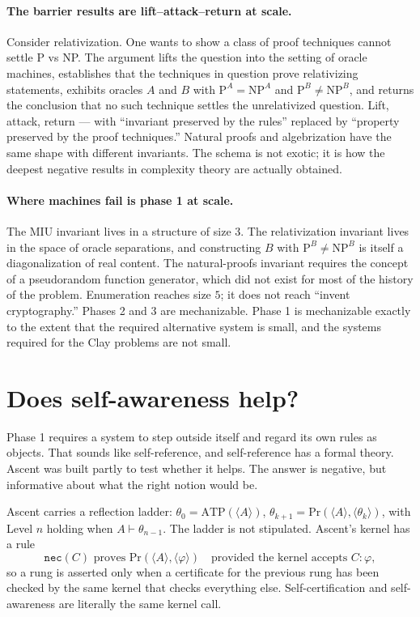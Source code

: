 \documentclass[11pt,a4paper]{article}
\newcommand{\ATP}{\mathrm{ATP}}
\renewcommand{\Pr}{\mathrm{Pr}}
\begin{document}
\paragraph{The barrier results are lift--attack--return at scale.} Consider
relativization. One wants to show a class of proof techniques cannot settle
P vs NP. The argument lifts the question into the setting of oracle machines,
establishes that the techniques in question prove relativizing statements,
exhibits oracles $A$ and $B$ with $\mathrm{P}^A = \mathrm{NP}^A$ and
$\mathrm{P}^B \neq \mathrm{NP}^B$, and returns the conclusion that no such
technique settles the unrelativized question. Lift, attack, return --- with
``invariant preserved by the rules'' replaced by ``property preserved by the
proof techniques.'' Natural proofs and algebrization have the same shape with
different invariants. The schema is not exotic; it is how the deepest negative
results in complexity theory are actually obtained.

\paragraph{Where machines fail is phase 1 at scale.} The MIU invariant lives in
a structure of size $3$. The relativization invariant lives in the space of
oracle separations, and constructing $B$ with $\mathrm{P}^B \neq \mathrm{NP}^B$
is itself a diagonalization of real content. The natural-proofs invariant
requires the concept of a pseudorandom function generator, which did not exist
for most of the history of the problem. Enumeration reaches size $5$; it does
not reach ``invent cryptography.'' Phases 2 and 3 are mechanizable. Phase 1 is
mechanizable exactly to the extent that the required alternative system is
small, and the systems required for the Clay problems are not small.

\section{Does self-awareness help?}

Phase 1 requires a system to step outside itself and regard its own rules as
objects. That sounds like self-reference, and self-reference has a formal
theory. Ascent was built partly to test whether it helps. The answer is
negative, but informative about what the right notion would be.

Ascent carries a reflection ladder: $\theta_0 = \ATP(\langle A \rangle)$,
$\theta_{k+1} = \Pr(\langle A \rangle, \langle \theta_k \rangle)$, with Level
$n$ holding when $A \vdash \theta_{n-1}$. The ladder is not stipulated.
Ascent's kernel has a rule
\[
\texttt{nec}(C) \text{ proves } \Pr(\langle A\rangle, \langle \varphi\rangle)
\quad\text{provided the kernel accepts } C : \varphi,
\]
so a rung is asserted only when a certificate for the previous rung has been
checked by the same kernel that checks everything else. Self-certification and
self-awareness are literally the same kernel call.
\end{document}

